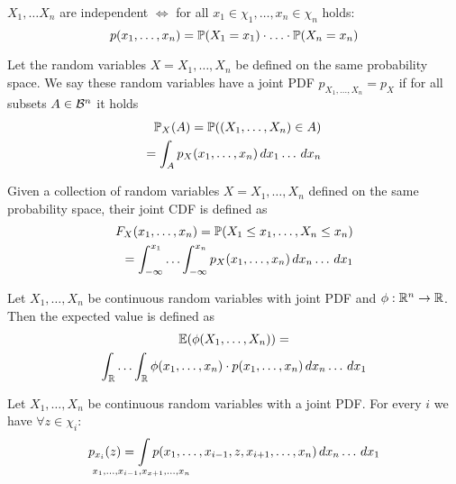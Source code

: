 \begin{proposition}
  \(X_1, \ldots X_n\) are independent \(\iff\) for all \(x_1 \in \chi_1, \ldots, x_n \in \chi_n\) holds: \[p(x_1, \ldots, x_n) = \P(X_1 = x_1) \cdot \ldots \cdot \P(X_n = x_n)\]
\end{proposition}

\begin{cdefinition*}
  Let the random variables \(X = X_1, \ldots, X_n\) be defined on the same probability space. We say these random variables have a joint PDF \(p_{X_1, \ldots, X_n} = p_X\) if for all subsets \(A \in \B^n\) it holds
  \begin{align*}
    \P_X(A) = \P((X_1, \ldots, X_n) \in A) \\
    = \int_A p_X(x_1, \ldots, x_n) \, dx_1 \ldots \,dx_n
  \end{align*}
\end{cdefinition*}

\begin{cdefinition*}
  Given a collection of random variables \(X = X_1, \ldots, X_n\) defined on the same probability space, their joint CDF is defined as
  \begin{align*}
    F_{X}(x_1, \ldots, x_n) = \P(X_1 \leq x_1, \ldots, X_n \leq x_n) \\
    = \int_{-\infty}^{x_1} \ldots \int_{-\infty}^{x_n} p_{X}(x_1, \ldots, x_n) \,dx_n \ldots \, dx_1
  \end{align*}
\end{cdefinition*}

\begin{proposition}
  Let \(X_1, \ldots, X_n\) be continuous random variables with joint PDF and \(\phi: \R^n \to \R\). Then the expected value is defined as
  \begin{multline*}
    \E(\phi(X_1, \ldots, X_n)) = \\ \int_\R \ldots \int_\R \phi(x_1, \ldots, x_n) \cdot p(x_1, \ldots, x_n) \, dx_n \ldots \, dx_1
  \end{multline*}
\end{proposition}

\begin{ctheorem*}
  Let \(X_1, \ldots, X_n\) be continuous random variables with a joint PDF. For every \(i\) we have \(\forall z \in \chi_i\):
  \[p_{x_i}(z) = \smashoperator{\int_{x_1, \ldots, x_{i-1}, x_{x+1}, \ldots, x_n}} p(x_1, \ldots, x_{i-1}, z, x_{i+1}, \ldots, x_n) \, dx_n \ldots \, dx_1\]
\end{ctheorem*}

